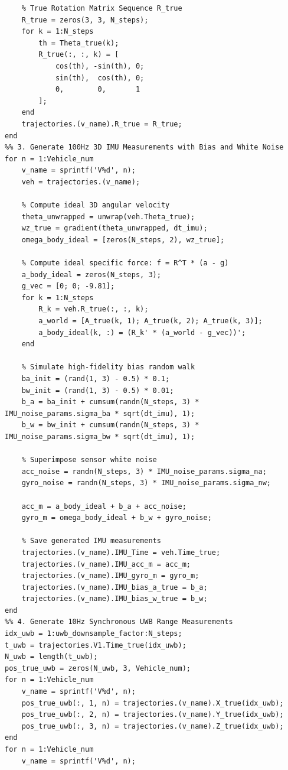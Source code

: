\documentclass[twocolumn,10pt]{article}
\begin{document}
\begin{lstlisting}
    % True Rotation Matrix Sequence R_true
    R_true = zeros(3, 3, N_steps);
    for k = 1:N_steps
        th = Theta_true(k);
        R_true(:, :, k) = [
            cos(th), -sin(th), 0;
            sin(th),  cos(th), 0;
            0,        0,       1
        ];
    end
    trajectories.(v_name).R_true = R_true;
end
%% 3. Generate 100Hz 3D IMU Measurements with Bias and White Noise
for n = 1:Vehicle_num
    v_name = sprintf('V%d', n);
    veh = trajectories.(v_name);
    
    % Compute ideal 3D angular velocity
    theta_unwrapped = unwrap(veh.Theta_true);
    wz_true = gradient(theta_unwrapped, dt_imu);
    omega_body_ideal = [zeros(N_steps, 2), wz_true];
    
    % Compute ideal specific force: f = R^T * (a - g)
    a_body_ideal = zeros(N_steps, 3);
    g_vec = [0; 0; -9.81];
    for k = 1:N_steps
        R_k = veh.R_true(:, :, k);
        a_world = [A_true(k, 1); A_true(k, 2); A_true(k, 3)];
        a_body_ideal(k, :) = (R_k' * (a_world - g_vec))';
    end
    
    % Simulate high-fidelity bias random walk
    ba_init = (rand(1, 3) - 0.5) * 0.1;    
    bw_init = (rand(1, 3) - 0.5) * 0.01;
    b_a = ba_init + cumsum(randn(N_steps, 3) * IMU_noise_params.sigma_ba * sqrt(dt_imu), 1);
    b_w = bw_init + cumsum(randn(N_steps, 3) * IMU_noise_params.sigma_bw * sqrt(dt_imu), 1);
    
    % Superimpose sensor white noise
    acc_noise = randn(N_steps, 3) * IMU_noise_params.sigma_na;
    gyro_noise = randn(N_steps, 3) * IMU_noise_params.sigma_nw;
    
    acc_m = a_body_ideal + b_a + acc_noise;
    gyro_m = omega_body_ideal + b_w + gyro_noise;
    
    % Save generated IMU measurements
    trajectories.(v_name).IMU_Time = veh.Time_true;
    trajectories.(v_name).IMU_acc_m = acc_m;
    trajectories.(v_name).IMU_gyro_m = gyro_m;
    trajectories.(v_name).IMU_bias_a_true = b_a;
    trajectories.(v_name).IMU_bias_w_true = b_w;
end
%% 4. Generate 10Hz Synchronous UWB Range Measurements
idx_uwb = 1:uwb_downsample_factor:N_steps;
t_uwb = trajectories.V1.Time_true(idx_uwb);
N_uwb = length(t_uwb);
pos_true_uwb = zeros(N_uwb, 3, Vehicle_num);
for n = 1:Vehicle_num
    v_name = sprintf('V%d', n);
    pos_true_uwb(:, 1, n) = trajectories.(v_name).X_true(idx_uwb);
    pos_true_uwb(:, 2, n) = trajectories.(v_name).Y_true(idx_uwb);
    pos_true_uwb(:, 3, n) = trajectories.(v_name).Z_true(idx_uwb);
end
for n = 1:Vehicle_num
    v_name = sprintf('V%d', n);
    

\end{lstlisting}
\end{document}
